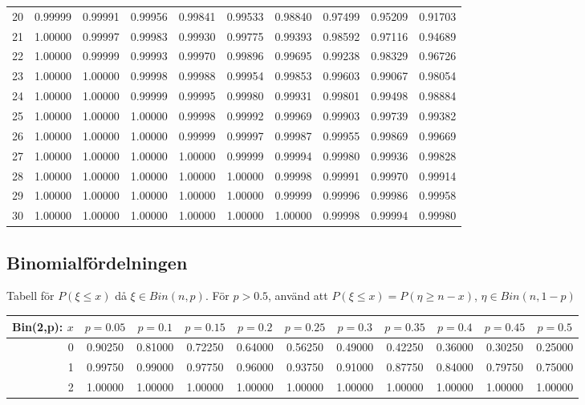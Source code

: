 \documentclass{article}
\begin{document}
{\begin{tabular}{|r|c|c|c|c|c|c|c|c|c|}
 20&0.99999&0.99991&0.99956&0.99841&0.99533&0.98840&0.97499&0.95209&0.91703\\
 21&1.00000&0.99997&0.99983&0.99930&0.99775&0.99393&0.98592&0.97116&0.94689\\
 22&1.00000&0.99999&0.99993&0.99970&0.99896&0.99695&0.99238&0.98329&0.96726\\
 23&1.00000&1.00000&0.99998&0.99988&0.99954&0.99853&0.99603&0.99067&0.98054\\
 24&1.00000&1.00000&0.99999&0.99995&0.99980&0.99931&0.99801&0.99498&0.98884\\
 25&1.00000&1.00000&1.00000&0.99998&0.99992&0.99969&0.99903&0.99739&0.99382\\
 26&1.00000&1.00000&1.00000&0.99999&0.99997&0.99987&0.99955&0.99869&0.99669\\
 27&1.00000&1.00000&1.00000&1.00000&0.99999&0.99994&0.99980&0.99936&0.99828\\
 28&1.00000&1.00000&1.00000&1.00000&1.00000&0.99998&0.99991&0.99970&0.99914\\
 29&1.00000&1.00000&1.00000&1.00000&1.00000&0.99999&0.99996&0.99986&0.99958\\
 30&1.00000&1.00000&1.00000&1.00000&1.00000&1.00000&0.99998&0.99994&0.99980\\
\hline
\end{tabular}

\vspace{8pt minus 6pt}
\subsection*{Binomialfördelningen}

Tabell för $P(\xi\le x)$ då $\xi\in B in(n,p)$.
För $p>0.5$, använd att $P(\xi\le x)=P(\eta\ge n-x)$,  $\eta\in B in(n,1-p)$

\medskip\begin{tabular}{@{\extracolsep{-2pt}}|r|c|c|c|c|c|c|c|c|c|c|}
\hline
Bin(2,p): $x$
   & $p\!=\!0.05$& $p\!=\!0.1$& $p\!=\!0.15$& $p\!=\!0.2$& $p\!=\!0.25$& $p\!=\!0.3$& $p\!=\!0.35$& $p\!=\!0.4$& $p\!=\!0.45$& $p\!=\!0.5$\\\hline
  0&0.90250&0.81000&0.72250&0.64000&0.56250&0.49000&0.42250&0.36000&0.30250&0.25000\\
  1&0.99750&0.99000&0.97750&0.96000&0.93750&0.91000&0.87750&0.84000&0.79750&0.75000\\
  2&1.00000&1.00000&1.00000&1.00000&1.00000&1.00000&1.00000&1.00000&1.00000&1.00000\\
\hline
\end{tabular}

}
\end{document}
